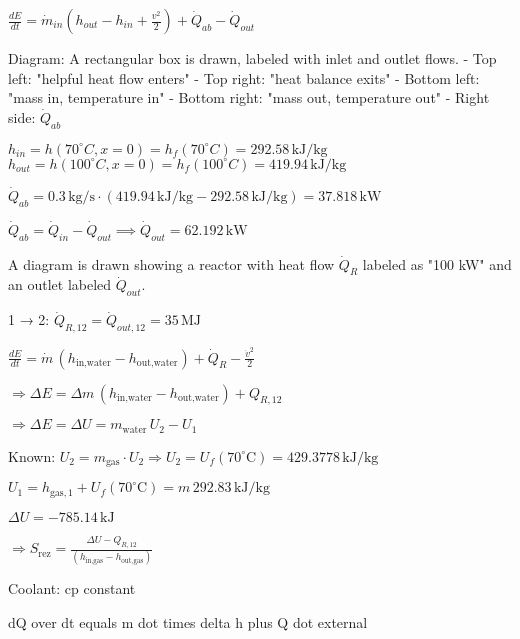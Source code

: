 \( \frac{dE}{dt} = \dot{m}_{in} (h_{out} - h_{in} + \frac{v^2}{2}) + \dot{Q}_{ab} - \dot{Q}_{out} \)  

Diagram:  
A rectangular box is drawn, labeled with inlet and outlet flows.  
- Top left: "helpful heat flow enters"  
- Top right: "heat balance exits"  
- Bottom left: "mass in, temperature in"  
- Bottom right: "mass out, temperature out"  
- Right side: \( \dot{Q}_{ab} \)  

\( h_{in} = h(70^\circ C, x = 0) = h_f(70^\circ C) = 292.58 \, \text{kJ/kg} \)  
\( h_{out} = h(100^\circ C, x = 0) = h_f(100^\circ C) = 419.94 \, \text{kJ/kg} \)  

\( \dot{Q}_{ab} = 0.3 \, \text{kg/s} \cdot (419.94 \, \text{kJ/kg} - 292.58 \, \text{kJ/kg}) = 37.818 \, \text{kW} \)  

\( \dot{Q}_{ab} = \dot{Q}_{in} - \dot{Q}_{out} \implies \dot{Q}_{out} = 62.192 \, \text{kW} \)

A diagram is drawn showing a reactor with heat flow \( \dot{Q}_R \) labeled as "100 kW" and an outlet labeled \( \dot{Q}_{out} \).  

1 → 2:  
\( \dot{Q}_{R,12} = \dot{Q}_{out,12} = 35 \, \text{MJ} \)  

\( \frac{dE}{dt} = \dot{m} \, (h_{\text{in,water}} - h_{\text{out,water}}) + \dot{Q}_R - \frac{\dot{v}^2}{2} \)  

\( \Rightarrow \Delta E = \Delta m \, (h_{\text{in,water}} - h_{\text{out,water}}) + Q_{R,12} \)  

\( \Rightarrow \Delta E = \Delta U = m_{\text{water}} \, U_2 - U_1 \)  

Known:  
\( U_2 = m_{\text{gas}} \cdot U_2 \Rightarrow U_2 = U_f(70^\circ \text{C}) = 429.3778 \, \text{kJ/kg} \)  

\( U_1 = h_{\text{gas},1} + U_f(70^\circ \text{C}) = m \, 292.83 \, \text{kJ/kg} \)  

\( \Delta U = -785.14 \, \text{kJ} \)  

\( \Rightarrow S_{\text{rez}} = \frac{\Delta U - Q_{R,12}}{(h_{\text{in,gas}} - h_{\text{out,gas}})} \)

Coolant:  
cp constant  

dQ over dt equals m dot times delta h plus Q dot external